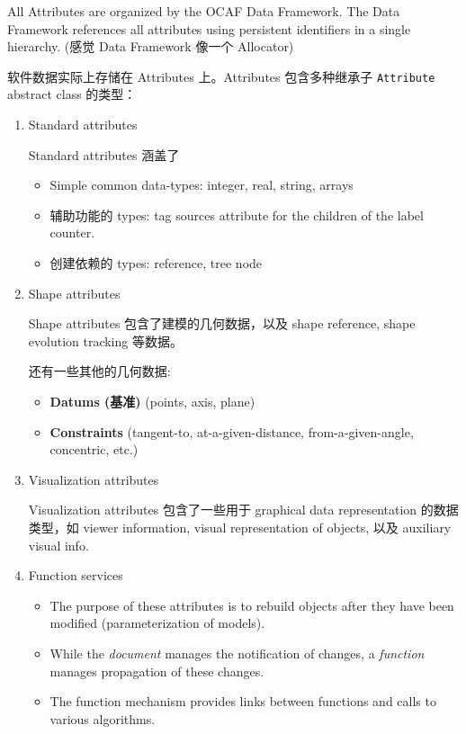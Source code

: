 \documentclass[11pt]{article}
\begin{document}
All Attributes are organized by the OCAF Data Framework. The Data Framework references all attributes using persistent identifiers in a single hierarchy. (感觉 Data Framework 像一个 Allocator)

软件数据实际上存储在 Attributes 上。Attributes 包含多种继承子 \texttt{Attribute} abstract class 的类型：
\begin{enumerate}
\item Standard attributes
\label{sec:orge1c9993}

Standard attributes 涵盖了

\begin{itemize}
\item Simple common data-types: integer, real, string, arrays
\item 辅助功能的 types: tag sources attribute for the children of the label counter.
\item 创建依赖的 types: reference, tree node
\end{itemize}
\item Shape attributes
\label{sec:org16d801a}

Shape attributes 包含了建模的几何数据，以及 shape reference, shape evolution tracking 等数据。

还有一些其他的几何数据:
\begin{itemize}
\item \textbf{Datums (基准)} (points, axis, plane)
\item \textbf{Constraints} (tangent-to, at-a-given-distance, from-a-given-angle, concentric, etc.)
\end{itemize}
\item Visualization attributes
\label{sec:org5bb25ad}

Visualization attributes 包含了一些用于 graphical data representation 的数据类型，如 viewer information, visual representation of objects, 以及 auxiliary visual info.
\item Function services
\label{sec:org18e41f6}

\begin{itemize}
\item The purpose of these attributes is to rebuild objects after they have been modified (parameterization of models).
\item While the \emph{document} manages the notification of changes, a \emph{function} manages propagation of these changes.
\item The function mechanism provides links between functions and calls to various algorithms.
\end{itemize}
\end{enumerate}
\end{document}
